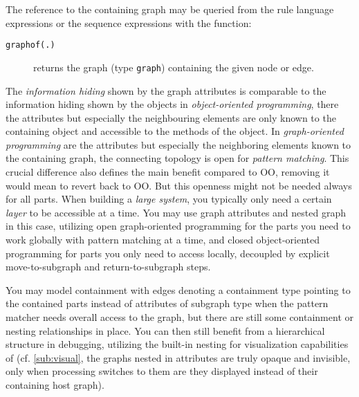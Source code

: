 The reference to the containing graph may be queried from the rule language expressions or the sequence expressions with the \texttt{} function:
\begin{description}
\item[\texttt{graphof(.)}] returns the graph (type \texttt{graph}) containing the given node or edge.
\end{description}

The \emph{information hiding} shown by the graph attributes is comparable to the information hiding shown by the objects in \emph{object-oriented programming}, there the attributes but especially the neighbouring elements are only known to the containing object and accessible to the methods of the object.
In \emph{graph-oriented programming} are the attributes but especially the neighboring elements known to the containing graph, the connecting topology is open for \emph{pattern matching}.
This crucial difference also defines the main benefit compared to OO, removing it would mean to revert back to OO.
But this openness might not be needed always for all parts.
When building a \emph{large system}, you typically only need a certain \emph{layer} to be accessible at a time.
You may use graph attributes and nested graph in this case,
utilizing open graph-oriented programming for the parts you need to work globally with pattern matching at a time,
and closed object-oriented programming for parts you only need to access locally,
decoupled by explicit move-to-subgraph and return-to-subgraph steps.

You may model containment with edges denoting a containment type pointing to the contained parts instead of attributes of subgraph type
when the pattern matcher needs overall access to the graph, but there are still some containment or nesting relationships in place.
You can then still benefit from a hierarchical structure in debugging, utilizing the built-in nesting for visualization capabilities of \GrG (cf. \ref{sub:visual}, the graphs nested in attributes are truly opaque and invisible, only when processing switches to them are they displayed instead of their containing host graph).

